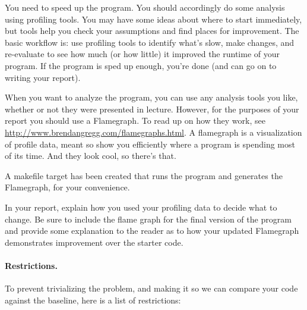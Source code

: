 \documentclass[letterpaper,10pt]{article}
\begin{document}
You need to speed up the program. You should accordingly do some analysis using profiling tools. You may have some ideas about where to start immediately, but tools help you check your assumptions and find places for improvement. The basic workflow is: use profiling tools to identify what's slow, make changes, and re-evaluate to see how much (or how little) it improved the runtime of your program. If the program is sped up enough, you're done (and can go on to writing your report).

When you want to analyze the program, you can use any analysis tools you like, whether or not they were presented in lecture. However, for the purposes of your report you should use a Flamegraph. To read up on how they work, see \url{http://www.brendangregg.com/flamegraphs.html}. A flamegraph is a visualization of profile data, meant so show you efficiently where a program is spending most of its time. And they look cool, so there's that.

A makefile target has been created that runs the program and generates the Flamegraph, for your convenience.

In your report, explain how you used your profiling data to decide what to change. Be sure to include the flame graph for the final version of the program and provide some explanation to the reader as to how your updated Flamegraph demonstrates improvement over the starter code.

\paragraph{Restrictions.}

To prevent trivializing the problem, and making it so we can compare your code against the baseline, here is a list of restrictions:
\end{document}
